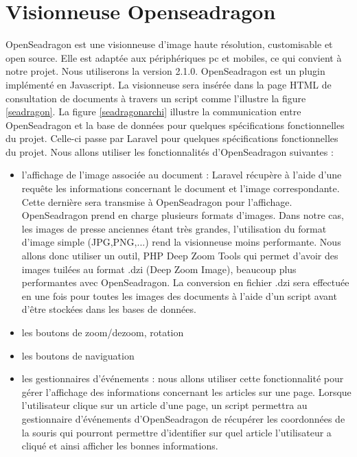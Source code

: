 \newpage
\section{Visionneuse Openseadragon}
\label{sec:seadragon}
OpenSeadragon est une visionneuse d’image haute résolution, customisable et open source. Elle est adaptée aux périphériques pc et mobiles, ce qui convient à notre projet. Nous utiliserons la version 2.1.0. OpenSeadragon est un plugin implémenté en Javascript. La visionneuse sera insérée dans la page HTML de consultation de documents à travers un script comme l'illustre la figure \ref{seadragon}. La figure \ref{seadragonarchi} illustre la communication entre OpenSeadragon et la base de données pour quelques spécifications fonctionnelles du projet. Celle-ci passe par Laravel pour quelques spécifications fonctionnelles du projet. Nous allons utiliser les fonctionnalités d'OpenSeadragon suivantes : 

\begin{itemize}
	\item l'affichage de l'image associée au document : Laravel  récupère à l'aide d'une requête les informations concernant le document et l'image correspondante. Cette dernière sera transmise à OpenSeadragon pour l'affichage. OpenSeadragon prend en charge plusieurs formats d'images. Dans notre cas, les images de presse anciennes étant très grandes, l'utilisation du format d'image simple (JPG,PNG,...) rend la visionneuse moins performante. Nous allons donc utiliser un outil, PHP Deep Zoom Tools qui permet d'avoir des images tuilées au format .dzi (Deep Zoom Image), beaucoup plus performantes avec OpenSeadragon. La conversion en fichier .dzi sera effectuée en une fois pour toutes les images des documents à l'aide d'un script avant d'être stockées dans les bases de données.
	\item les boutons de zoom/dezoom, rotation 
	\item les boutons de naviguation 
	\item les gestionnaires d'événements : nous allons utiliser cette fonctionnalité pour gérer l'affichage des informations concernant les articles sur une page. Lorsque l'utilisateur clique sur un article d'une page, un script permettra au gestionnaire d'événements d'OpenSeadragon de récupérer les coordonnées de la souris qui pourront permettre d'identifier sur quel article l'utilisateur a cliqué et ainsi afficher les bonnes informations.
	\end{itemize}
	
